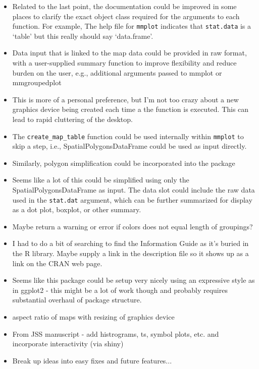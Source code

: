 \documentclass[letterpaper,12pt]{article}\usepackage[]{graphicx}\usepackage[]{color}
\begin{document}
\begin{itemize}
\item Related to the last point, the documentation could be improved in some places to clarify the exact object class required for the arguments to each function.  For example, The help file for \texttt{mmplot} indicates that \texttt{stat.data} is a `table' but this really should say `data.frame'.
\item Data input that is linked to the map data could be provided in raw format, with a user-supplied summary function to improve flexibility and reduce burden on the user, e.g., additional arguments passed to mmplot or mmgroupedplot
\item This is more of a personal preference, but I'm not too crazy about a new graphics device being created each time a the function is executed.  This can lead to rapid cluttering of the desktop.
\item The \texttt{create\_map\_table} function could be used internally within \texttt{mmplot} to skip a step, i.e., SpatialPolygonsDataFrame could be used as input directly. 
\item Similarly, polygon simplification could be incorporated into the package
\item Seems like a lot of this could be simplified using only the SpatialPolygonsDataFrame as input.  The data slot could include the raw data used in the \texttt{stat.dat} argument, which can be further summarized for display as a dot plot, boxplot, or other summary.  
\item Maybe return a warning or error if colors does not equal length of groupings?
\item I had to do a bit of searching to find the Information Guide as it's buried in the R library.  Maybe supply a link in the description file so it shows up as a link on the CRAN web page. 
\item Seems like this package could be setup very nicely using an expressive style as in ggplot2 - this might be a lot of work though and probably requires substantial overhaul of package structure.  
\item aspect ratio of maps with resizing of graphics device
\item From JSS manuscript - add histrograms, ts, symbol plots, etc. and incorporate interactivity (via shiny)
\item Break up ideas into easy fixes and future features...
\end{itemize}
\end{document}
